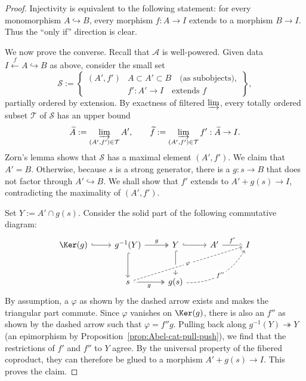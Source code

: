 \begin{proof}
Injectivity is equivalent to the following statement: for every monomorphism
$A\hookrightarrow B$, every morphism $f:A\to I$ extends to a morphism
$B\to I$. Thus the ``only if'' direction is clear.

We now prove the converse. Recall that $\mathcal{A}$ is well-powered. Given
data $I\xleftarrow{f}A\hookrightarrow B$ as above, consider the small set
\[\mathcal{S}:=\left\{\begin{array}{r|l}
	(A',f')&A\subset A'\subset B\quad\text{(as subobjects)},\\
	&f':A'\to I\quad\text{extends }f
\end{array}\right\},\]
partially ordered by extension. By exactness of filtered $\varinjlim$, every
totally ordered subset $\mathcal{T}$ of $\mathcal{S}$ has an upper bound
\[\widetilde{A}:=\varinjlim_{(A',f')\in\mathcal{T}}A',\qquad
\widetilde{f}:=\varinjlim_{(A',f')\in\mathcal{T}}f':\widetilde{A}\to I.\]
Zorn's lemma shows that $\mathcal{S}$ has a maximal element $(A',f')$. We
claim that $A'=B$. Otherwise, because $s$ is a strong generator, there is a
$g:s\to B$ that does not factor through $A'\hookrightarrow B$. We shall show
that $f'$ extends to $A'+g(s)\to I$, contradicting the maximality of
$(A',f')$.

Set $Y:=A'\cap g(s)$. Consider the solid part of the following commutative
diagram:
\[\begin{tikzcd}[row sep=large]
	\Ker(g)\arrow[hookrightarrow,r]&g^{-1}(Y)
	\arrow[twoheadrightarrow,r,"g"]\arrow[hookrightarrow,d]
	&Y\arrow[hookrightarrow,r]\arrow[hookrightarrow,d]
	&A'\arrow[r,"{f'}"]&I\\
	&s\arrow[twoheadrightarrow,r,"g"']
	\arrow[dashed,rrru,crossing over,"\varphi" description]
	&g(s)\arrow[dashed,bend right,rru,"{f''}" description]&&
\end{tikzcd}\]
By assumption, a $\varphi$ as shown by the dashed arrow exists and makes the
triangular part commute. Since $\varphi$ vanishes on $\Ker(g)$, there is also
an $f''$ as shown by the dashed arrow such that $\varphi=f''g$. Pulling back
along $g^{-1}(Y)\twoheadrightarrow Y$ (an epimorphism by
Proposition~\ref{prop:Abel-cat-pull-push}), we find that the restrictions of
$f'$ and $f''$ to $Y$ agree. By the universal property of the fibered
coproduct, they can therefore be glued to a morphism $A'+g(s)\to I$. This
proves the claim.
\end{proof}

